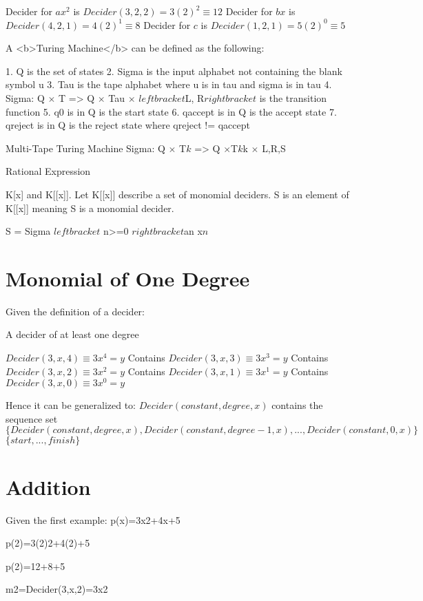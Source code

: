 Decider for $ax^2$ is $Decider(3,2,2) = 3(2)^2 \equiv 12$
Decider for $bx$ is $Decider(4,2,1) = 4(2)^1 \equiv 8$
Decider for $c$ is $Decider(1,2,1) = 5(2)^0 \equiv 5$

A <b>Turing Machine</b> can be defined as the following:

1. Q is the set of states
2. Sigma is the input alphabet not containing the blank symbol u
3. Tau is the tape alphabet where u is in tau and sigma is in tau
4. Sigma: Q $\times$ T => Q $\times $ Tau $\times $ $left bracket$L, R$right bracket$ is the transition function
5. q0 is in Q is the start state
6. qaccept is in Q is the accept state
7. qreject is in Q is the reject state where qreject != qaccept

Multi-Tape Turing Machine
Sigma: Q $\times $ T$k$ => Q $\times $T$k$k $\times $ {L,R,S}

Rational Expression

K[x] and K[[x]]. Let K[[x]] describe a set of monomial deciders. S is an element of K[[x]] meaning S is a monomial decider.

S = Sigma $left bracket$ n>=0 $right bracket$an x$n$


\section{Monomial of One Degree}

Given the definition of a decider:

A decider of at least one degree

$Decider(3,x,4) \equiv 3x^4 = y$
Contains $Decider(3,x,3) \equiv 3x^3 = y$
Contains $Decider(3,x,2) \equiv 3x^2 = y$
Contains $Decider(3,x,1) \equiv 3x^1 = y$
Contains $Decider(3,x,0) \equiv 3x^0 = y$

Hence it can be generalized to:
$Decider(constant,degree,x)$ contains the sequence set 
$\{Decider(constant,degree,x),Decider(constant,degree-1,x),...,Decider(constant,0,x)\}$
$\{start,...,finish\}$

\section{Addition}

Given the first example:
p(x)=3x2+4x+5

p(2)=3(2)2+4(2)+5

p(2)=12+8+5


m2=Decider(3,x,2)=3x2

